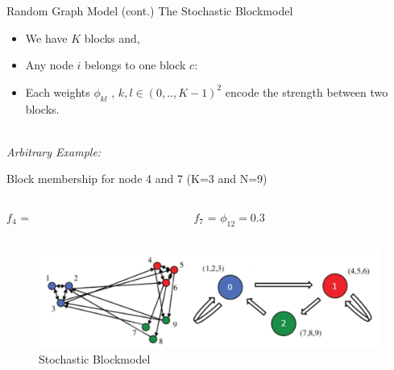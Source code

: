 \newcommand\setrow{}

\begin{frame}[t]{Random Graph Model (cont.)}
    The Stochastic Blockmodel 

    \begin{itemize}
        \item We have $K$ blocks and,
        \item Any node $i$ belongs to one block $c$:
        \item Each weights $\phi_{kl}$ , $k,l \in (0, .., K-1)^2$  encode the strength between two blocks.
    \end{itemize}

    ~\\
    \emph{Arbitrary Example:}

    \begin{block}{Block membership for node 4 and 7 (K=3 and N=9)}

    \begin{columns}[t]
        \begin{column}{0.45\textwidth}
        $f_4$ = \raisebox{-2pt}{}
        \end{column}
        \begin{column}{0.45\textwidth}
            \hspace{-1.5cm}
        $f_7$ = \raisebox{-2pt}{}
            \hspace{0.5cm}
        $\phi_{12} = 0.3$
        \end{column}
    \end{columns}

    \end{block}

    \begin{figure}[h]
    \includegraphics[scale=0.3]{img/sb}
        \caption{Stochastic Blockmodel}
    \end{figure}
    
\end{frame}

